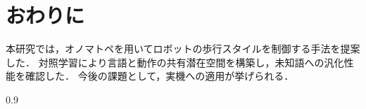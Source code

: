 \documentclass[10pt,twocolumn]{jarticle}
\begin{document}
\section{おわりに}
本研究では，オノマトペを用いてロボットの歩行スタイルを制御する手法を提案した．
対照学習により言語と動作の共有潜在空間を構築し，未知語への汎化性能を確認した．
今後の課題として，実機への適用が挙げられる．
\begin{spacing}{0.9}


\end{spacing}
\end{document}
